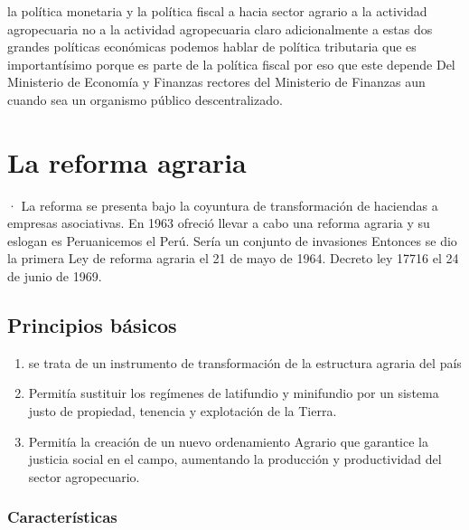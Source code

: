 \documentclass[
  a4paper,
]{article}
\begin{document}
la política monetaria y la política fiscal a hacia sector agrario a la
actividad agropecuaria no a la actividad agropecuaria claro
adicionalmente a estas dos grandes políticas económicas podemos hablar
de política tributaria que es importantísimo porque es parte de la
política fiscal por eso que este depende Del Ministerio de Economía y
Finanzas rectores del Ministerio de Finanzas aun cuando sea un organismo
público descentralizado.

\hypertarget{la-reforma-agraria}{%
\section{La reforma agraria}\label{la-reforma-agraria}}

· La reforma se presenta bajo la coyuntura de transformación de
haciendas a empresas asociativas. En 1963 ofreció llevar a cabo una
reforma agraria y su eslogan es Peruanicemos el Perú. Sería un conjunto
de invasiones Entonces se dio la primera Ley de reforma agraria el 21 de
mayo de 1964. Decreto ley 17716 el 24 de junio de 1969.

\hypertarget{principios-buxe1sicos}{%
\subsection{Principios básicos}\label{principios-buxe1sicos}}

\begin{enumerate}
\def\labelenumi{\arabic{enumi}.}
\item
  se trata de un instrumento de transformación de la estructura agraria
  del país
\item
  Permitía sustituir los regímenes de latifundio y minifundio por un
  sistema justo de propiedad, tenencia y explotación de la Tierra.
\item
  Permitía la creación de un nuevo ordenamiento Agrario que garantice la
  justicia social en el campo, aumentando la producción y productividad
  del sector agropecuario.
\end{enumerate}

\hypertarget{caracteruxedsticas}{%
\subsubsection{Características}\label{caracteruxedsticas}}
\end{document}
